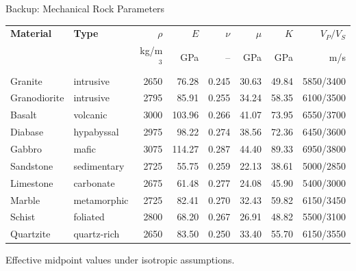 \documentclass[aspectratio=169,10pt]{beamer}
\begin{document}
\begin{frame}{Backup: Mechanical Rock Parameters}
  \scriptsize
  \renewcommand{\arraystretch}{1.12}
  \setlength{\tabcolsep}{2.6pt}
  \begin{tabular}{l|l|r|r|r|r|r|r}
    \hline
    \textbf{Material} & \textbf{Type} & $\rho$ & $E$ & $\nu$ & $\mu$ & $K$ & $V_P/V_S$ \\
    & & kg/m$^3$ & GPa & -- & GPa & GPa & m/s \\
    \hline
    Granite      & intrusive   & 2650 &  76.28 & 0.245 & 30.63 & 49.84 & 5850/3400 \\
    Granodiorite & intrusive   & 2795 &  85.91 & 0.255 & 34.24 & 58.35 & 6100/3500 \\
    Basalt       & volcanic    & 3000 & 103.96 & 0.266 & 41.07 & 73.95 & 6550/3700 \\
    Diabase      & hypabyssal  & 2975 &  98.22 & 0.274 & 38.56 & 72.36 & 6450/3600 \\
    Gabbro       & mafic       & 3075 & 114.27 & 0.287 & 44.40 & 89.33 & 6950/3800 \\
    Sandstone    & sedimentary & 2725 &  55.75 & 0.259 & 22.13 & 38.61 & 5000/2850 \\
    Limestone    & carbonate   & 2675 &  61.48 & 0.277 & 24.08 & 45.90 & 5400/3000 \\
    Marble       & metamorphic & 2725 &  82.41 & 0.270 & 32.43 & 59.82 & 6150/3450 \\
    Schist       & foliated    & 2800 &  68.20 & 0.267 & 26.91 & 48.82 & 5500/3100 \\
    Quartzite    & quartz-rich & 2650 &  83.50 & 0.250 & 33.40 & 55.70 & 6150/3550 \\
    \hline
  \end{tabular}
  \vskip 6pt
  Effective midpoint values under isotropic assumptions.
\end{frame}
\end{document}
